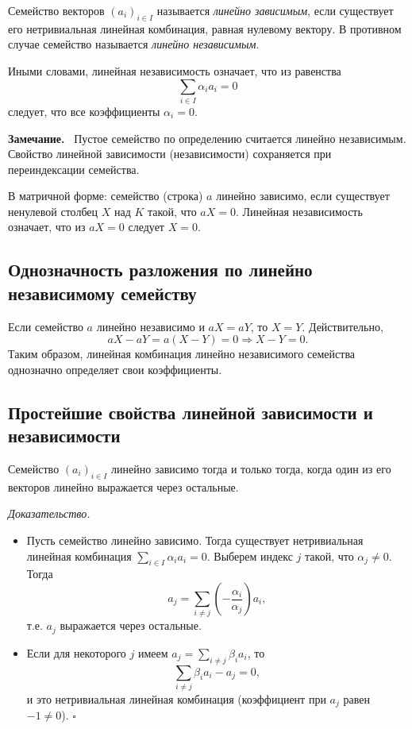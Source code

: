 \documentclass[a4paper,12pt]{article}
\newcommand{\myremark}{\textbf{Замечание.}\ }
\theoremstyle{definition}
\theoremstyle{plain}
\theoremstyle{remark}
\begin{document}
	\begin{tcolorbox}[colback=red!5, colframe=red!50!black, title=Определение]
		Семейство векторов \( (a_i)_{i \in I} \) называется \textit{линейно зависимым}, если существует его нетривиальная линейная комбинация, равная нулевому вектору. В противном случае семейство называется \textit{линейно независимым}.
	\end{tcolorbox}
	
	Иными словами, линейная независимость означает, что из равенства
	\[
	\sum_{i \in I} \alpha_i a_i = 0
	\]
	следует, что все коэффициенты \( \alpha_i = 0 \).
	
	\myremark
	Пустое семейство по определению считается линейно независимым. Свойство линейной зависимости (независимости) сохраняется при переиндексации семейства.
	
	В матричной форме: семейство (строка) \( a \) линейно зависимо, если существует ненулевой столбец \( X \) над \( K \) такой, что \( aX = 0 \). Линейная независимость означает, что из \( aX = 0 \) следует \( X = 0 \).
	
	\subsection{Однозначность разложения по линейно независимому семейству}
	
	Если семейство \( a \) линейно независимо и \( aX = aY \), то \( X = Y \). Действительно,
	\[
	aX - aY = a(X - Y) = 0 \Rightarrow X - Y = 0.
	\]
	Таким образом, линейная комбинация линейно независимого семейства однозначно определяет свои коэффициенты.
	
	\subsection{Простейшие свойства линейной зависимости и независимости}
	
	\begin{tcolorbox}[colback=yellow!5, colframe=orange!50!black, title=Свойство 1]
		Семейство \( (a_i)_{i \in I} \) линейно зависимо тогда и только тогда, когда один из его векторов линейно выражается через остальные.
	\end{tcolorbox}
	
	\medskip
	\textit{Доказательство.}
	\begin{itemize}
		\item[\(\Rightarrow\)] Пусть семейство линейно зависимо. Тогда существует нетривиальная линейная комбинация \( \sum_{i \in I} \alpha_i a_i = 0 \). Выберем индекс \( j \) такой, что \( \alpha_j \neq 0 \). Тогда
		\[
		a_j = \sum_{i \neq j} \left( -\frac{\alpha_i}{\alpha_j} \right) a_i,
		\]
		т.е. \( a_j \) выражается через остальные.
		\item[\(\Leftarrow\)] Если для некоторого \( j \) имеем \( a_j = \sum_{i \neq j} \beta_i a_i \), то
		\[
		\sum_{i \neq j} \beta_i a_i - a_j = 0,
		\]
		и это нетривиальная линейная комбинация (коэффициент при \( a_j \) равен \(-1 \neq 0\)). \hfill \(\square\)
	\end{itemize}
	
\end{document}
